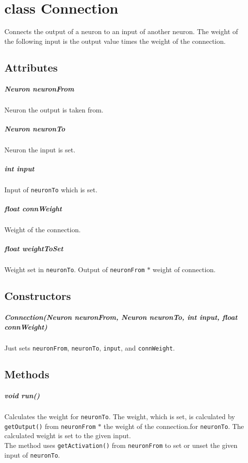 \chapter{class Connection}
Connects the output of a neuron to an input of another neuron. The weight of the following input is the output value times the weight of the connection.

\section{Attributes}
\paragraph{Neuron neuronFrom}
Neuron the output is taken from.

\paragraph{Neuron neuronTo}
Neuron the input is set.

\paragraph{int input}
Input of \texttt{neuronTo} which is set.

\paragraph{float connWeight}
Weight of the connection.

\paragraph{float weightToSet}
Weight set in \texttt{neuronTo}. Output of \texttt{neuronFrom} $*$ weight of connection.

\section{Constructors}
\paragraph{Connection(Neuron neuronFrom, Neuron neuronTo, int input, float connWeight)}
Just sets \texttt{neuronFrom}, \texttt{neuronTo}, \texttt{input}, and \texttt{connWeight}.

\section{Methods}
\paragraph{void run()}
Calculates the weight for \texttt{neuronTo}. The weight, which is set, is calculated by \texttt{getOutput()} from \texttt{neuronFrom} $*$ the weight of the connection.for \texttt{neuronTo}. The calculated weight is set to the given input.\\
The method uses \texttt{getActivation()} from \texttt{neuronFrom} to set or unset the given input of \texttt{neuronTo}.